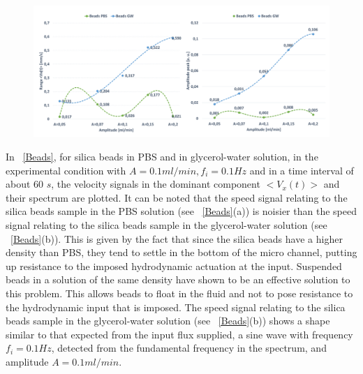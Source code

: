 \documentclass[journal]{IEEEtran}
\theoremstyle{definition}
\theoremstyle{remark}
\begin{document}
\begin{figure}[t]
\end{figure}

\begin{figure}[t]
	\centering
	\includegraphics[width=2\columnwidth]{images/BeadsFinal}
\end{figure}

In ~\fig\ref{Beads}, for silica beads in PBS and in glycerol-water solution, in the experimental condition with {$A=0.1 ml/min, f_i= 0.1 Hz$} and in a time interval of about 60 $s$, the velocity signals in the dominant component  $<V_x(t)>$ and their spectrum are plotted.
It can be noted that the speed signal relating to the silica beads sample in the PBS solution (see ~\fig\ref{Beads}(a)) is noisier than the speed signal relating to the silica beads sample in the glycerol-water solution (see ~\fig\ref{Beads}(b)). This is given by the fact that since the silica beads have a higher density than PBS, they tend to settle in the bottom of the micro channel, putting up resistance to the imposed hydrodynamic actuation at the input. Suspended beads in a solution of the same density have shown to be an effective solution to this problem. This allows beads to float in the fluid and not to pose resistance to the hydrodynamic input that is imposed. The speed signal relating to the silica beads sample in the glycerol-water solution (see ~\fig\ref{Beads}(b)) shows a shape similar to that expected from the input flux supplied, a sine wave with frequency $f_i= 0.1 Hz$, detected from the fundamental frequency in the spectrum, and amplitude $A={0.1 ml/min}$.
\end{document}
